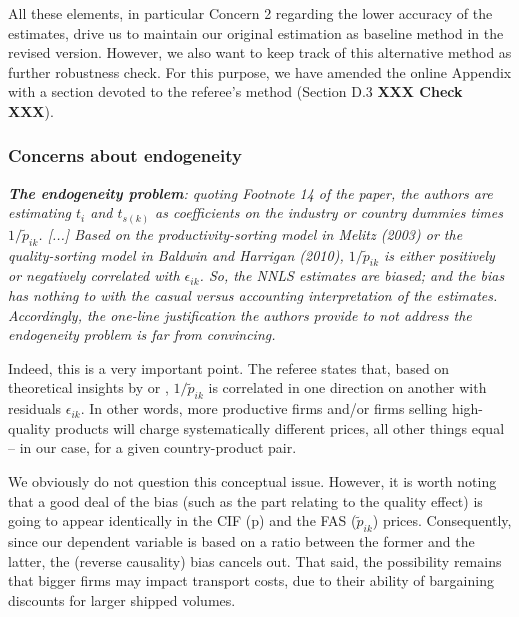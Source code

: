 \documentclass[a4paper,11pt]{article}
\begin{document}
All these elements, in particular Concern 2 regarding the lower accuracy of the estimates, drive us to maintain our original estimation as baseline method in the revised version. However, we also want to keep track of this alternative method as further robustness check. For this purpose, we have amended the online Appendix with a section devoted to the referee's method (Section D.3 \textbf{XXX Check XXX}).



\subsubsection{Concerns about endogeneity}

\textit{\textbf{The endogeneity problem}: quoting Footnote 14 of the paper, the authors
are estimating $t_i$ and $t_{s(k)}$ as coefficients on the industry or country
dummies times $1/\widetilde{p}_{ik}$. [...] Based on the productivity-sorting model in Melitz (2003) or the quality-sorting
model in Baldwin and Harrigan (2010),  $1/\widetilde{p}_{ik}$ is either positively
or negatively correlated with $\epsilon_{ik}$. So, the NNLS estimates are biased; and
the bias has nothing to with the casual versus accounting interpretation of
the estimates. Accordingly, the one-line justification the authors provide
to not address the endogeneity problem is far from convincing.}

Indeed, this is a very important point. The referee states that, based on theoretical insights by \citet{melitz} or \citet{baldwin_harrigan}, $1/\widetilde{p}_{ik}$ is correlated in one direction on another with residuals $\epsilon_{ik}$. In other words, more productive firms and/or firms selling high-quality products will charge systematically different prices, all other things equal – in our case, for a given country-product pair.

We obviously do not question this conceptual issue. However, it is worth noting that a good deal of the bias (such as the part relating to the quality effect) is going to appear identically in the CIF (p) and the FAS ($\widetilde{p}_{ik}$) prices. Consequently, since our dependent variable is based on a ratio between the former and the latter, the (reverse causality) bias cancels out. That said, the possibility remains that bigger firms may impact transport costs, due to their ability of bargaining discounts for larger shipped volumes.
\end{document}
